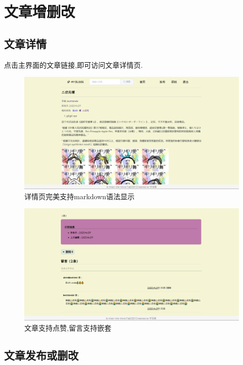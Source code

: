 \section{文章增删改}

\subsection{文章详情}

点击主界面的文章链接,即可访问文章详情页.
\begin{figure}[thbp!]
	\centering
	\includegraphics[scale=0.35]{figure/article1}
	\caption{详情页完美支持markdown语法显示}
\end{figure}

\begin{figure}[thbp!]
	\centering
	\includegraphics[scale=0.35]{figure/article2}
	\caption{文章支持点赞,留言支持嵌套}
\end{figure}

\subsection{文章发布或删改}

